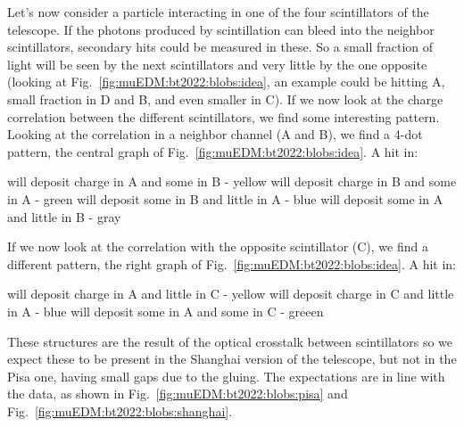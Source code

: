\begin{refsection}
            \noindent
            Let's now consider a particle interacting in one of the four scintillators of the telescope. 
            If the photons produced by scintillation can bleed into the neighbor scintillators, secondary hits could be measured in these.
            So a small fraction of light will be seen by the next scintillators and very little by the one opposite (looking at Fig.~\ref{fig:muEDM:bt2022:blobs:idea}, an example could be hitting A, small fraction in D and B, and even smaller in C).
            If we now look at the charge correlation between the different scintillators, we find some interesting pattern.\\ 
            Looking at the correlation in a neighbor channel (A and B), we find a 4-dot pattern, the central graph of Fig.~\ref{fig:muEDM:bt2022:blobs:idea}. A hit in:
            \begin{outline}
                \1[A] will deposit charge in A and some in B - yellow
                \1[B] will deposit charge in B and some in A - green
                \1[C] will deposit some in B and little in A - blue
                \1[D] will deposit some in A and little in B - gray
            \end{outline} 
            If we now look at the correlation with the opposite scintillator (C), we find a different pattern, the right graph of Fig.~\ref{fig:muEDM:bt2022:blobs:idea}.
            A hit in:
            \begin{outline}
                \1[A] will deposit charge in A and little in C - yellow
                \1[C] will deposit charge in C and little in A - blue
                \1[B/D] will deposit some in A and some in C - greeen
            \end{outline} 
            These structures are the result of the optical crosstalk between scintillators so we expect these to be present in the Shanghai version of the telescope, but not in the Pisa one, having small gaps due to the gluing.
            The expectations are in line with the data, as shown in Fig.~\ref{fig:muEDM:bt2022:blobs:pisa} and Fig.~\ref{fig:muEDM:bt2022:blobs:shanghai}. 
        \begin{figure}   
            \centering
            \\

\end{figure}
\end{refsection}
